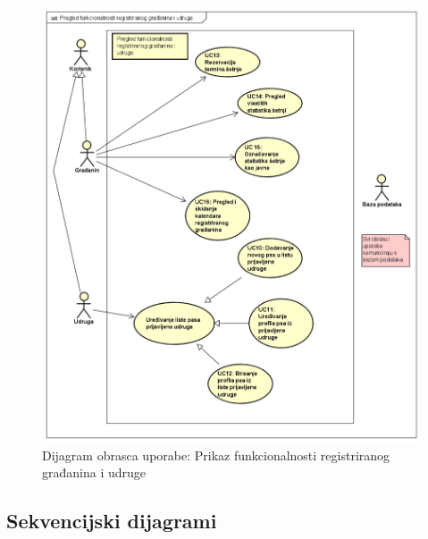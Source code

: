 				\begin{figure}[H]
					\includegraphics[scale=0.55]{dijagrami/usecase2.PNG} %
					\caption{Dijagram obrasca uporabe: Prikaz funkcionalnosti registriranog građanina i udruge}
					\label{fig:usecase2} %
				\end{figure}
		\eject	
			
		\subsection{Sekvencijski dijagrami}

